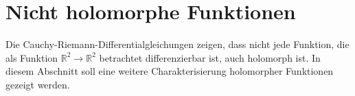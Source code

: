 %
%
%
\section{Nicht holomorphe Funktionen
\label{buch:holomorph:section:nichtholomorph}}
Die Cauchy-Riemann-Differentialgleichungen zeigen, dass nicht jede
Funktion, die als Funktion $\mathbb{R}^2\to\mathbb{R}^2$ betrachtet
differenzierbar ist, auch holomorph ist.
In diesem Abschnitt soll eine weitere Charakterisierung holomorpher
Funktionen gezeigt werden.



